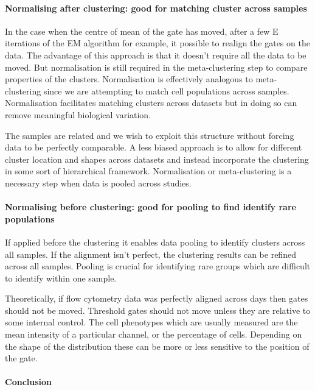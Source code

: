 \paragraph{Normalising after clustering: good for matching cluster across samples}

In the case when the centre of mean of the gate has moved, after a few E iterations of the EM algorithm for example, it possible to realign the gates on the data.
The advantage of this approach is that it doesn’t require all the data to be moved.
But normalisation is still required in the meta-clustering step to compare properties of the clusters.
Normalisation is effectively analogous to meta-clustering since we are attempting to match cell populations across samples.  
Normalisation facilitates matching clusters across datasets but in doing so can remove meaningful biological variation.  

The samples are related and we wish to exploit this structure without forcing data to be perfectly comparable.
A less biased approach is to allow for different cluster location and shapes across datasets and instead incorporate the clustering in some sort of hierarchical framework.  
Normalisation or meta-clustering is a necessary step when data is pooled across studies.


\paragraph{Normalising before clustering: good for pooling to find identify rare populations}

If applied before the clustering it enables data pooling to identify clusters across all samples. If the alignment isn’t perfect, the clustering results can be refined across all samples. Pooling is crucial for identifying rare groups which are difficult to identify within one sample.

Theoretically, if flow cytometry data was perfectly aligned across days then gates should not be moved.  
Threshold gates should not move unless they are relative to some internal control.
The cell phenotypes which are usually measured are the mean intensity of a particular channel, or the percentage of cells.
Depending on the shape of the distribution these can be more or less sensitive to the position of the gate.

\paragraph{Conclusion}

